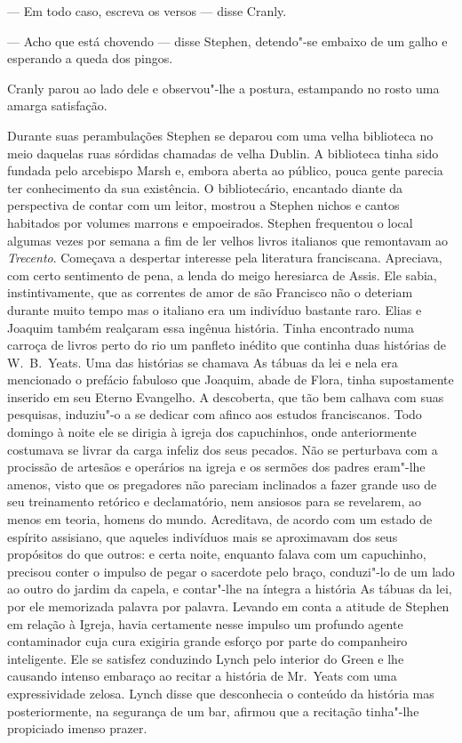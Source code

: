 --- Em todo caso, escreva os versos --- disse Cranly.

--- Acho que está chovendo --- disse Stephen, detendo"-se embaixo de um galho e
esperando a queda dos pingos.

Cranly parou ao lado dele e observou"-lhe a postura, estampando no rosto uma
amarga satisfação.

Durante suas perambulações Stephen se deparou com uma velha biblioteca no meio
daquelas ruas sórdidas chamadas de velha Dublin.  A biblioteca tinha sido
fundada pelo arcebispo Marsh e, embora aberta ao público, pouca gente parecia
ter conhecimento da sua existência.  O bibliotecário, encantado diante
da perspectiva de contar com um leitor, mostrou a Stephen nichos e cantos
habitados por volumes marrons e empoeirados.  Stephen frequentou o local
algumas vezes por semana a fim de ler velhos livros italianos que remontavam ao
\textit{Trecento}.  Começava a despertar interesse pela literatura franciscana.
Apreciava, com certo sentimento de pena, a lenda do meigo heresiarca de Assis.
Ele sabia, instintivamente, que as correntes de amor de são Francisco não o
deteriam durante muito tempo mas o italiano era um indivíduo bastante raro.
Elias e Joaquim também realçaram essa ingênua história.  Tinha encontrado numa
carroça de livros perto do rio um panfleto inédito que continha duas histórias
de W.~B.~Yeats.  Uma das histórias se chamava As tábuas da lei e nela		
era mencionado o prefácio fabuloso que Joaquim, abade de Flora, tinha
supostamente inserido em seu Eterno Evangelho.  A descoberta, que tão bem
calhava com suas pesquisas, induziu"-o a se dedicar com afinco aos estudos
franciscanos.  Todo domingo à noite ele se dirigia à igreja dos capuchinhos,
onde anteriormente costumava se livrar da carga infeliz dos seus pecados.  Não
se perturbava com a procissão de artesãos e operários na igreja e os sermões
dos padres eram"-lhe amenos, visto que os pregadores não pareciam inclinados a
fazer grande uso de seu treinamento retórico e declamatório, nem ansiosos para se
revelarem, ao menos em teoria, homens do mundo.  Acreditava, de acordo com um
estado de espírito assisiano, que aqueles indivíduos mais se aproximavam dos
seus propósitos do que outros: e certa noite, enquanto falava com um
capuchinho, precisou conter o impulso de pegar o sacerdote pelo braço,
conduzi"-lo de um lado ao outro do jardim da capela, e contar"-lhe na íntegra a
história As tábuas da lei, por ele memorizada palavra por palavra.
Levando em conta a atitude de Stephen em relação à Igreja, havia certamente
nesse impulso um profundo agente contaminador cuja cura exigiria grande esforço
por parte do companheiro inteligente.  Ele se satisfez conduzindo Lynch pelo
interior do Green e lhe causando intenso embaraço ao recitar a história de 
Mr.~Yeats com uma expressividade zelosa.  Lynch disse que desconhecia o conteúdo da
história mas posteriormente, na segurança de um bar, afirmou que a recitação
tinha"-lhe propiciado imenso prazer.


